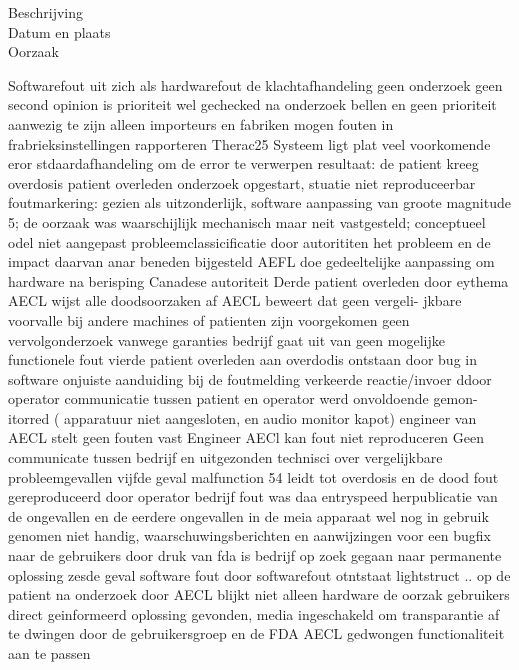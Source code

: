 \begin{description}
\item[Beschrijving]
\item[Datum en plaats] 
\item[Oorzaak]
\end{description}
Softwarefout uit zich als hardwarefout de klachtafhandeling geen onderzoek geen second opinion is prioriteit wel 
gechecked na onderzoek bellen en geen prioriteit aanwezig te zijn alleen importeurs en fabriken mogen fouten 
in frabrieksinstellingen rapporteren 
Therac25 Systeem ligt plat veel voorkomende eror stdaardafhandeling om de error te verwerpen resultaat: 
de patient kreeg overdosis patient overleden onderzoek opgestart, stuatie niet reproduceerbar foutmarkering: 
gezien als uitzonderlijk, software aanpassing van groote magnitude 5; de oorzaak was waarschijlijk mechanisch 
maar neit vastgesteld; conceptueel odel niet aangepast probleemclassicificatie door autorititen het probleem 
en de impact daarvan anar beneden bijgesteld AEFL doe gedeeltelijke aanpassing om hardware na berisping 
Canadese autoriteit 
Derde patient overleden door eythema AECL wijst alle doodsoorzaken af AECL beweert dat geen vergeli- 
jkbare voorvalle bij andere machines of patienten zijn voorgekomen geen vervolgonderzoek vanwege garanties 
bedrijf gaat uit van geen mogelijke functionele fout 
vierde patient overleden aan overdodis ontstaan door bug in software onjuiste aanduiding bij de foutmelding 
verkeerde reactie/invoer ddoor operator communicatie tussen patient en operator werd onvoldoende gemon- 
itorred ( apparatuur niet aangesloten, en audio monitor kapot) engineer van AECL stelt geen fouten vast 
Engineer AECl kan fout niet reproduceren Geen communicate tussen bedrijf en uitgezonden technisci over 
vergelijkbare probleemgevallen 
vijfde geval malfunction 54 leidt tot overdosis en de dood fout gereproduceerd door operator bedrijf fout 
was daa entryspeed herpublicatie van de ongevallen en de eerdere ongevallen in de meia apparaat wel nog in 
gebruik genomen niet handig, waarschuwingsberichten en aanwijzingen voor een bugfix naar de gebruikers door 
druk van fda is bedrijf op zoek gegaan naar permanente oplossing 
zesde geval software fout door softwarefout otntstaat lightstruct .. op de patient na onderzoek door AECL 
blijkt niet alleen hardware de oorzak gebruikers direct geinformeerd oplossing gevonden, media ingeschakeld om transparantie af te dwingen door de gebruikersgroep en de FDA AECL gedwongen functionaliteit aan te passen 
